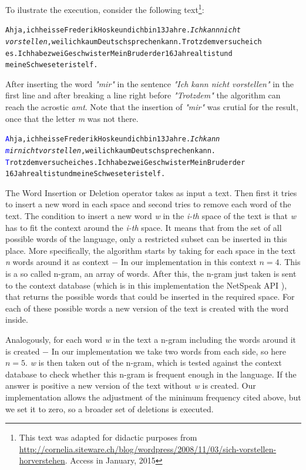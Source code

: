 \documentclass{reportAlternative}
\begin{document}
To ilustrate the execution, consider the following text\footnote{This text was adapted for didactic purposes from \url{http://cornelia.siteware.ch/blog/wordpress/2008/11/03/sich-vorstellen-horverstehen}. Access in January, 2015}:
\begin{alltt}
Ah ja, ich heisse Frederik Hoske und ich bin 13 Jahre. \textit{Ich kann nicht
vorstellen}, weil ich kaum Deutsch sprechen kann. Trotzdem versuche ich
es. Ich habe zwei Geschwister Mein Bruder der 16 Jahre alt ist und
meine Schweseter ist elf.
\end{alltt}

After inserting the word \emph{"mir"} in the sentence \emph{"Ich kann nicht vorstellen"} in the first line and after breaking a line right before \emph{"Trotzdem"} the algorithm can reach the acrostic \emph{amt}. Note that the insertion of \emph{"mir"} was crutial for the result, once that the letter \emph{m} was not there.

\begin{alltt}
\textcolor{Blue}{A}h ja, ich heisse Frederik Hoske und ich bin 13 Jahre. \textit{Ich kann
\textcolor{Blue}{m}ir nicht vorstellen}, weil ich kaum Deutsch sprechen kann.
\textcolor{Blue}{T}rotzdem versuche ich es. Ich habe zwei Geschwister Mein Bruder der
16 Jahre alt ist und meine Schweseter ist elf.
\end{alltt}

The Word Insertion or Deletion operator takes as input a text. Then first it tries to insert a new word in each space and second tries to remove each word of the text. The condition to insert a new word \emph{w} in the \emph{i-th} space of the text is that \emph{w} has to fit the context around the \emph{i-th} space. It means that from the set of all possible words of the language, only a restricted subset can be inserted in this place. More specifically, the algorithm starts by taking for each space in the text \emph{n} words around it as context $-$ In our implementation in this context $n = 4$. This is a so called n-gram, an array of words. After this, the n-gram just taken is sent to the context database (which is in this implementation the NetSpeak API \cite{Netspeak}), that returns the possible words that could be inserted in the required space. For each of these possible words a new version of the text is created with the word inside. \par

Analogously, for each word \emph{w} in the text a n-gram including the words around it is created $-$ In our implementation we take two words from each side, so here $n=5$. \emph{w} is then taken out of the n-gram, which is tested against the context database to check whether this n-gram is frequent enough in the language. If the answer is positive a new version of the text without \emph{w} is created. Our implementation allows the adjustment of the minimum frequency cited above, but we set it to zero, so a broader set of deletions is executed. \par
\end{document}
